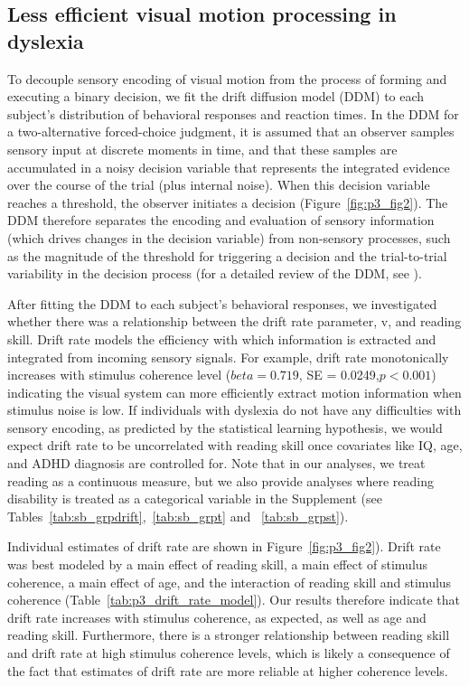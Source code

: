 \documentclass[../uwthesis.tex]{subfiles}
\begin{document}
\subsection{Less efficient visual motion processing in dyslexia}
To decouple sensory encoding of visual motion from the process of forming and executing a binary decision, we fit the drift diffusion model (DDM) to each subject’s distribution of behavioral responses and reaction times. In the DDM for a two-alternative forced-choice judgment, it is assumed that an observer samples sensory input at discrete moments in time, and that these samples are accumulated in a noisy decision variable that represents the integrated evidence over the course of the trial (plus internal noise). When this decision variable reaches a threshold, the observer initiates a decision (Figure~\ref{fig:p3_fig2}). The DDM therefore separates the encoding and evaluation of sensory information (which drives changes in the decision variable) from non-sensory processes, such as the magnitude of the threshold for triggering a decision and the trial-to-trial variability in the decision process (for a detailed review of the DDM, see \citep{Ratcliff2004ATask,Ratcliff2008TheTasks}).

After fitting the DDM to each subject’s behavioral responses, we investigated whether
there was a relationship between the drift rate parameter, v, and reading skill. Drift rate models the efficiency with which information is extracted and integrated from incoming sensory signals. For example, drift rate monotonically increases with stimulus coherence level ($beta = 0.719$, SE = 0.0249,$p<0.001$) indicating the visual system can more efficiently extract motion information when stimulus noise is low. If individuals with dyslexia do not have any difficulties with sensory encoding, as predicted by the statistical learning hypothesis, we would expect drift rate to be uncorrelated with reading skill once covariates like IQ, age, and ADHD diagnosis are controlled for. Note that in our analyses, we treat reading as a continuous measure, but we also provide analyses where reading disability is treated as a categorical variable in the Supplement (see Tables~\ref{tab:sb_grpdrift},~\ref{tab:sb_grpt} and ~\ref{tab:sb_grpst}). 

Individual estimates of drift rate are shown in Figure~\ref{fig:p3_fig2}). Drift rate was best modeled by a main effect of reading skill, a main effect of stimulus coherence, a main effect of age, and the interaction of reading skill and stimulus coherence (Table~\ref{tab:p3_drift_rate_model}). Our results therefore indicate that drift rate increases with stimulus coherence, as expected, as well as age and reading skill. Furthermore, there is a stronger relationship between reading skill and drift rate at high stimulus coherence levels, which is likely a consequence of the fact that estimates of drift rate are more reliable at higher coherence levels.
\end{document}
